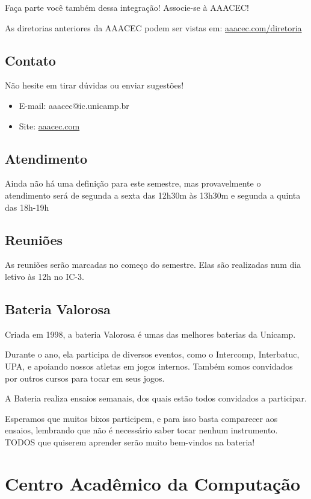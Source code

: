 Faça parte você também dessa integração! Associe-se à AAACEC!

As diretorias anteriores da AAACEC podem ser vistas em:
\url{aaacec.com/diretoria}

\subsection{Contato}

Não hesite em tirar dúvidas ou enviar sugestões!

\begin{itemize}
\item  E-mail: aaacec@ic.unicamp.br
\item  Site: \url{aaacec.com}
\end{itemize}

\subsection{Atendimento}

Ainda não há uma definição para este semestre, mas provavelmente o atendimento
será de segunda a sexta das 12h30m às 13h30m e segunda a quinta das 18h-19h

\subsection{Reuniões}

As reuniões serão marcadas no começo do semestre. Elas são realizadas num dia
letivo às 12h no IC-3.

\subsection{Bateria Valorosa}

Criada em 1998, a bateria Valorosa é umas das melhores baterias da Unicamp.

Durante o ano, ela participa de diversos eventos, como o Intercomp, Interbatuc,
UPA, e apoiando nossos atletas em jogos internos. Também somos convidados por
outros cursos para tocar em seus jogos.

A Bateria realiza ensaios semanais, dos quais estão todos convidados a
participar.

Esperamos que muitos bixos participem, e para isso basta comparecer aos ensaios,
lembrando que não é necessário saber tocar nenhum instrumento. TODOS que
quiserem aprender serão muito bem-vindos na bateria!

\section{Centro Acadêmico da Computação}


